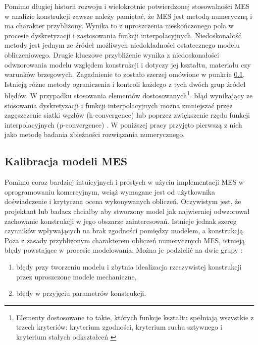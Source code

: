 Pomimo długiej historii rozwoju i wielokrotnie potwierdzonej stosowalności MES w analizie konstrukcji zawsze należy pamiętać, że MES jest metodą numeryczną i ma charakter przybliżony. Wynika to z uproszczenia nieskończonego pola w procesie dyskretyzacji  i zastosowania funkcji interpolacyjnych. Niedoskonałość metody jest jednym ze źródeł możliwych niedokładności ostatecznego modelu obliczeniowego. Drugie kluczowe przybliżenie wynika z niedoskonałości odwzorowania modelu względem konstrukcji i dotyczy jej kształtu, materiału czy warunków brzegowych. Zagadnienie to zostało szerzej omówione w punkcie \ref{sect:calibration_model}. Istnieją różne metody ograniczenia i kontroli każdego z tych dwóch grup źródeł błędów. W przypadku stosowania elementów dostosowanych\footnote{
	Elementy dostosowane to takie, których funkcje kształtu spełniają wszystkie z trzech kryteriów: kryterium zgodności, kryterium ruchu sztywnego i kryterium stałych odkształceń \parencite{Rakowski2016}}.
błąd wynikający ze stosowania dyskretyzacji i funkcji interpolacyjnych można zmniejszać przez zagęszczenie siatki węzłów (h-convergence) lub poprzez zwiększenie rzędu funkcji interpolacyjnych (p-convergence) \parencite{Zienkiewicz2005}. W poniższej pracy przyjęto pierwszą z nich jako metodę badania zbieżności rozwiązania numerycznego.

\subsection{Kalibracja modeli MES} \label{sect:calibration_model}
Pomimo coraz bardziej intuicyjnych i prostych w użyciu implementacji MES w oprogramowaniu komercyjnym, wciąż wymagane jest od użytkownika doświadczenie i krytyczna ocena wykonywanych obliczeń. Oczywistym jest, że projektant lub badacz chciałby aby stworzony model jak najwierniej odwzorował zachowanie konstrukcji w jego obszarze zainteresowań. Istnieje jednak szereg czynników wpływających na brak zgodności pomiędzy modelem, a konstrukcją. Poza z zasady przybliżonym charakterem obliczeń numerycznych MES, istnieją błędy powstające w procesie modelowania. Można je podzielić na dwie grupy \parencite{Mottershead1993,Mottershead2011}:
\begin{enumerate}
	\item błędy przy tworzeniu modelu i zbytnia idealizacja rzeczywistej konstrukcji przez uproszczone modele mechaniczne,
	\item błędy w przyjęciu parametrów konstrukcji.
\end{enumerate}

